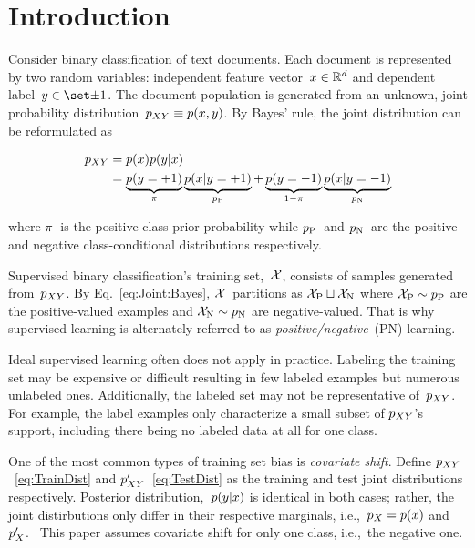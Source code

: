 \documentclass[]{subfiles}
\begin{document}
\section{Introduction}\label{sec:Introduction}

Consider binary classification of text documents.  Each document is represented by two random variables: independent feature vector~${x \in \mathbb{R}^{d}}$ and dependent label~${\y \in \domainY}$. The document population is generated from an unknown, joint probability distribution~${p_{XY} \equiv p(x,y)}$.  By Bayes' rule, the joint distribution can be reformulated as

\begin{align}
    p_{XY} &= p(x) p(y \vert x) \label{eq:TrainDist} \\
           &= \underbrace{p(y = {+}1)}_{\pi} \underbrace{p(x \vert y = {+}1)}_{p_{\textnormal{P}}} + \underbrace{p(y = {-}1)}_{1-\pi} \underbrace{p(x \vert y = {-}1)}_{p_{\textnormal{N}}} \label{eq:Joint:Bayes}
\end{align}

\noindent
where $\pi$~is the positive class prior probability while $p_{\textnormal{P}}$~and $p_{\textnormal{N}}$~are the positive and negative class-conditional distributions respectively.

Supervised binary classification's training set,~$\mathcal{X}$, consists of samples generated from~$p_{XY}$. By Eq.~\eqref{eq:Joint:Bayes}, $\mathcal{X}$~partitions as ${\mathcal{X}_{\textnormal{P}} \sqcup \mathcal{X}_{\textnormal{N}}}$ where ${\mathcal{X}_{\textnormal{P}} \sim p_{\textnormal{P}}}$ are the positive-valued examples and ${\mathcal{X}_{\textnormal{N}} \sim p_{\textnormal{N}}}$ are negative-valued.  That is why supervised learning is alternately referred to as \textit{positive\-/negative}~(PN) learning.

Ideal supervised learning often does not apply in practice.  Labeling the training set may be expensive or difficult resulting in few labeled examples but numerous unlabeled ones.  Additionally, the labeled set may not be representative of~$p_{XY}$.  For example, the label examples only characterize a small subset of $p_{XY}$'s support, including there being no labeled data at all for one class.

One of the most common types of training set bias is \textit{covariate shift}. Define $p_{XY}$~\eqref{eq:TrainDist} and ${p_{XY}'}$~\eqref{eq:TestDist} as the training and test joint distributions respectively.  Posterior distribution,~${p(y \vert x)}$ is identical in both cases; rather, the joint distirbutions only differ in their respective marginals, i.e.,~${p_{X}=p(x)}$ and~$p_{X}'$.~\cite{Huang:2006}  This paper assumes covariate shift for only one class, i.e.,~the negative one.
\end{document}
